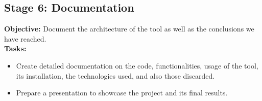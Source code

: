 \subsection{Stage 6: Documentation}
\textbf{Objective:} Document the architecture of the tool as well as the conclusions we have reached.\\

\textbf{Tasks:}
\begin{itemize}
    \item Create detailed documentation on the code, functionalities, usage of the tool, its installation, the technologies used, and also those discarded. 
    \item Prepare a presentation to showcase the project and its final results.  
\end{itemize}










